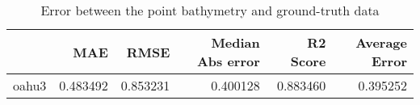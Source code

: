 \begin{table}[h!]
\caption{Error between the point bathymetry and ground-truth data}
\label{tab:oahu3_lidar_error}
\begin{tabular}{lrrrrr}
\toprule
 & MAE & RMSE & Median Abs error & R2 Score & Average Error \\
\midrule
oahu3 & 0.483492 & 0.853231 & 0.400128 & 0.883460 & 0.395252 \\
\bottomrule
\end{tabular}
\end{table}
